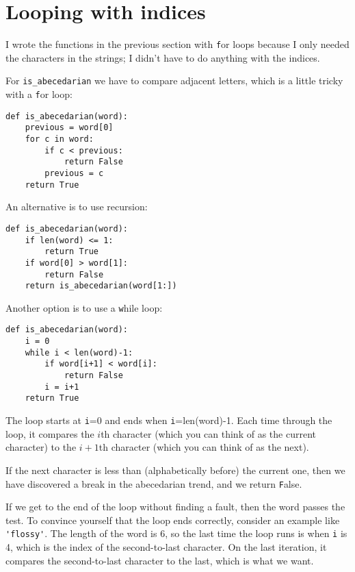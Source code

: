 \documentclass[
DIV=11,
fontsize=13,
twoside,
headinclude=false,
titlepage=firstiscover,
abstract=true,
headsepline=true,
footsepline=true,
chapterprefix=true, %
headings=big,
bibliography=totoc,%
captions=tableheading
]{scrbook}
\theoremstyle{definition}
\begin{document}
\section{Looping with indices}

I wrote the functions in the previous section with {\texttt for}
loops because I only needed the characters in the strings; I didn't
have to do anything with the indices.

For \verb"is_abecedarian" we have to compare adjacent letters,
which is a little tricky with a {\texttt for} loop:

\begin{lstlisting}
def is_abecedarian(word):
    previous = word[0]
    for c in word:
        if c < previous:
            return False
        previous = c
    return True
\end{lstlisting}

An alternative is to use recursion:

\begin{lstlisting}
def is_abecedarian(word):
    if len(word) <= 1:
        return True
    if word[0] > word[1]:
        return False
    return is_abecedarian(word[1:])
\end{lstlisting}

Another option is to use a {\texttt while} loop:

\begin{lstlisting}
def is_abecedarian(word):
    i = 0
    while i < len(word)-1:
        if word[i+1] < word[i]:
            return False
        i = i+1
    return True
\end{lstlisting}
%
The loop starts at {\texttt i=0} and ends when {\texttt i=len(word)-1}.  Each
time through the loop, it compares the $i$th character (which you can
think of as the current character) to the $i+1$th character (which you
can think of as the next).

If the next character is less than (alphabetically before) the current
one, then we have discovered a break in the abecedarian trend, and
we return {\texttt False}.

If we get to the end of the loop without finding a fault, then the
word passes the test.  To convince yourself that the loop ends
correctly, consider an example like \verb"'flossy'".  The
length of the word is 6, so
the last time the loop runs is when {\texttt i} is 4, which is the
index of the second-to-last character.  On the last iteration,
it compares the second-to-last character to the last, which is
what we want.
\end{document}
